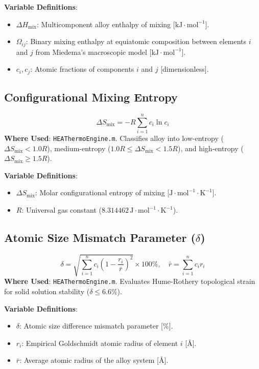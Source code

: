 \documentclass[11pt,a4paper]{article}
\begin{document}
\noindent\textbf{Variable Definitions}:
\begin{itemize}
  \item $\Delta H_{\text{mix}}$: Multicomponent alloy enthalpy of mixing [$\text{kJ}\cdot\text{mol}^{-1}$].
  \item $\Omega_{ij}$: Binary mixing enthalpy at equiatomic composition between elements $i$ and $j$ from Miedema's macroscopic model [$\text{kJ}\cdot\text{mol}^{-1}$].
  \item $c_i, c_j$: Atomic fractions of components $i$ and $j$ [dimensionless].
\end{itemize}

\subsection{Configurational Mixing Entropy}
\begin{equation}
\Delta S_{\text{mix}} = -R \sum_{i=1}^n c_i \ln c_i
\end{equation}
\textbf{Where Used}: \texttt{HEAThermoEngine.m}. Classifies alloy into low-entropy ($\Delta S_{\text{mix}} < 1.0 R$), medium-entropy ($1.0 R \le \Delta S_{\text{mix}} < 1.5 R$), and high-entropy ($\Delta S_{\text{mix}} \ge 1.5 R$).

\noindent\textbf{Variable Definitions}:
\begin{itemize}
  \item $\Delta S_{\text{mix}}$: Molar configurational entropy of mixing [$\text{J}\cdot\text{mol}^{-1}\cdot\text{K}^{-1}$].
  \item $R$: Universal gas constant ($8.314462 \, \text{J}\cdot\text{mol}^{-1}\cdot\text{K}^{-1}$).
\end{itemize}

\subsection{Atomic Size Mismatch Parameter ($\delta$)}
\begin{equation}
\delta = \sqrt{\sum_{i=1}^n c_i \left(1 - \frac{r_i}{\bar{r}}\right)^2} \times 100\%, \quad \bar{r} = \sum_{i=1}^n c_i r_i
\end{equation}
\textbf{Where Used}: \texttt{HEAThermoEngine.m}. Evaluates Hume-Rothery topological strain for solid solution stability ($\delta \le 6.6\%$).

\noindent\textbf{Variable Definitions}:
\begin{itemize}
  \item $\delta$: Atomic size difference mismatch parameter [$\%$].
  \item $r_i$: Empirical Goldschmidt atomic radius of element $i$ [$\text{\AA}$].
  \item $\bar{r}$: Average atomic radius of the alloy system [$\text{\AA}$].
\end{itemize}
\end{document}
